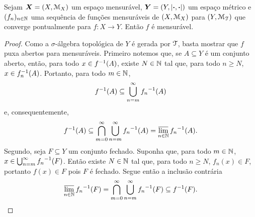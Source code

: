 \begin{proposition}
\label{ana:conv.pont.func.mens}
Sejam $\bm X = (X,\mathcal{M}_X)$ um espaço mensurável, $\bm Y = (Y,\left\vert{\bm{\cdot}},{\bm{\cdot}}\right\vert)$ um espaço métrico e $(f_n)_{n \in \mathbb{N}}$ uma sequência de funções mensuráveis de $(X,\mathcal{M}_X)$ para $(Y,\mathcal{M}_{\mathcal{T}})$ que converge pontualmente para $f\colon X \to Y$. Então $f$ é mensurável.
\end{proposition}
\begin{proof}
Como a $\sigma$-álgebra topológica de $Y$ é gerada por $\mathcal{T}$, basta mostrar que $f$ puxa abertos para mensuráveis. Primeiro notemos que, se $A \subseteq Y$ é um conjunto aberto, então, para todo $x \in f^{-1}(A)$, existe $N \in \mathbb{N}$ tal que, para todo $n \geq N$, $x \in f_n^{-1}(A)$. Portanto, para todo $m \in \mathbb{N}$,
	\begin{equation*}
	f^{-1}(A) \subseteq \bigcup_{n=m}^\infty {f_n}^{-1} (A)
	\end{equation*}
e, consequentemente,
	\begin{equation*}
	f^{-1}(A) \subseteq \bigcap_{m=0}^\infty \bigcup_{n=m}^\infty {f_n}^{-1}(A) = \varlimsup_{n \in \mathbb{N}} {f_n}^{-1}(A).
	\end{equation*}
Segundo, seja $F \subseteq Y$ um conjunto fechado. Suponha que, para todo $m \in \mathbb{N}$, $x \in \bigcup_{n=m}^\infty {f_n}^{-1} (F)$. Então existe $N \in \mathbb{N}$ tal que, para todo $n \geq N$, $f_n(x) \in F$, portanto $f(x) \in F$ pois $F$  é fechado. Segue então a inclusão contrária
	\begin{equation*}
	\varlimsup_{n \in \mathbb{N}} {f_n}^{-1}(F) = \bigcap_{m=0}^\infty \bigcup_{n=m}^\infty {f_n}^{-1}(F) \subseteq f^{-1}(F).
	\end{equation*}


\end{proof}
